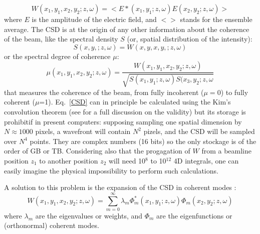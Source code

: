 \documentclass{iucr}              %
\begin{document}
\begin{equation}\label{CSD}
W(x_1,y_1,x_2,y_2;z,\omega) = <E*(x_1,y_1; z,\omega) E(x_2,y_2;z,\omega)>
\end{equation}
where $E$ is the amplitude of the electric field, and $<>$ stands for the ensemble average. The CSD is at the origin of any other information about the coherence of the beam, like the spectral density $S$ (or, spatial distribution of the intensity): 
\begin{equation}\label{SD}
S(x,y,;z,\omega) = W(x,y,x,y,;z,\omega)
\end{equation}
or the spectral degree of coherence $\mu$:
\begin{equation}\label{SDC}
\mu(x_1,y_1,x_2,y_2;z,\omega) = \frac{W(x_1,y_1,x_2,y_2;z,\omega)}{\sqrt{ S(x_1,y_1;z,\omega) S(x_3,y_2;z,\omega}}
\end{equation}
that measures the coherence of the beam, from fully incoherent ($\mu=0$) to fully coherent ($\mu$=1). 
Eq.~\ref{CSD} can in principle be calculated using the Kim's convolution theorem \cite{kim1986} (see \cite{geloni2008} for a full discussion on the validity) but its storage is prohibitif in present computers: supposing sampling one spatial dimension by $N\approx1000$ pixels, a wavefront will contain $N^2$ pizels, and the CSD will be sampled over $N^4$ points. They are complex numbers (16 bits) so the only stockage is of the order of GB or TB. Considering also that the progagation of $W$ from a beamline position $z_1$ to another position $z_2$ will need 10$^8$ to 10$^{12}$ 4D integrals, one can easily imagine the physical impossibility to perform such calculations. 

A solution to this problem is the expansion of the CSD in coherent modes \cite{mandel_wolf}:  
\begin{equation}\label{decomposition}
 W(x_1,y_1,x_2,y_2;z,\omega) = \sum\limits_{m=0}^{\infty} \lambda_m \Phi_m^{*}(x_1,y_1;z,\omega) \Phi_m(x_2,y_2;z,\omega)
 \end{equation}
where $\lambda_m$ are the eigenvalues or weights, and $\Phi_m$ are the eigenfunctions or (orthonormal) coherent modes. 
\end{document}
